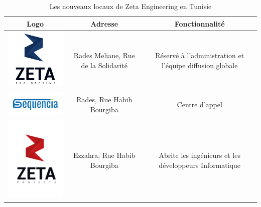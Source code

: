 \begin{table}[H]
\begin{center}
     \begin{tabular}{|c{5cm}|c{5cm}|c{5cm}|}
    \hline
	\textbf{Logo}         & \textbf{Adresse}   & \textbf{Fonctionnalité} \\
    \hline
    
	\includegraphics[width=5cm]{Images/logo-zeta1.png} & Rades Meliane, Rue de la Solidarité  & Réservé à l'administration et l'équipe diffusion globale  \\
	
 	\hline
 	
	\includegraphics[width=5cm]{Images/logo-Sequencia.png}   &  Rades, Rue Habib Bourgiba  &  Centre d'appel \\
	
	\hline
	
	\includegraphics[width=5cm]{Images/Logo-ZetaProject.png}  & Ezzahra, Rue Habib Bourgiba    & Abrite les ingénieurs et les développeurs Informatique  \\
	
	\hline
	
     \end{tabular}
     \caption{Les nouveaux locaux de Zeta Engineering en Tunisie}
     \label{1}
     \end{center}
\end{table}

